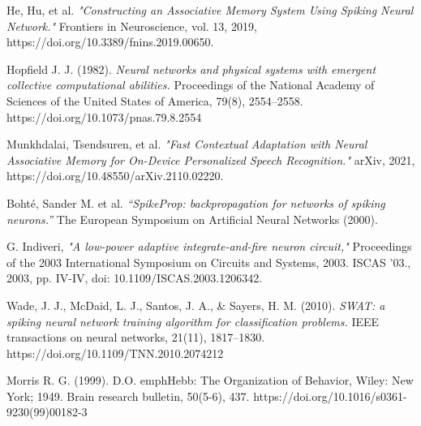 \begin{thebibliography}{99}

	He, Hu, et al. \emph{"Constructing an Associative Memory System Using Spiking Neural Network."} Frontiers in Neuroscience, vol. 13, 2019, https://doi.org/10.3389/fnins.2019.00650.

	Hopfield J. J. (1982). \emph{Neural networks and physical systems with emergent collective computational abilities.} Proceedings of the National Academy of Sciences of the United States of America, 79(8), 2554–2558. https://doi.org/10.1073/pnas.79.8.2554

	Munkhdalai, Tsendsuren, et al. \emph{"Fast Contextual Adaptation with Neural Associative Memory for On-Device Personalized Speech Recognition."} arXiv, 2021, https://doi.org/10.48550/arXiv.2110.02220.

	Bohté, Sander M. et al. \emph{“SpikeProp: backpropagation for networks of spiking neurons.”} The European Symposium on Artificial Neural Networks (2000).

	G. Indiveri, \emph{"A low-power adaptive integrate-and-fire neuron circuit,"} Proceedings of the 2003 International Symposium on Circuits and Systems, 2003. ISCAS '03., 2003, pp. IV-IV, doi: 10.1109/ISCAS.2003.1206342.

	Wade, J. J., McDaid, L. J., Santos, J. A., \& Sayers, H. M. (2010). \emph{SWAT: a spiking neural network training algorithm for classification problems.} IEEE transactions on neural networks, 21(11), 1817–1830. https://doi.org/10.1109/TNN.2010.2074212

	Morris R. G. (1999). D.O. emph{Hebb: The Organization of Behavior,} Wiley: New York; 1949. Brain research bulletin, 50(5-6), 437. https://doi.org/10.1016/s0361-9230(99)00182-3



\end{thebibliography}

